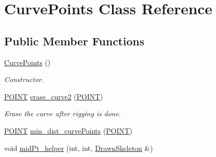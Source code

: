 \hypertarget{classCurvePoints}{\section{\-Curve\-Points \-Class \-Reference}
\label{classCurvePoints}
}
\subsection*{\-Public \-Member \-Functions}
\begin{DoxyCompactItemize}
\item 
\hypertarget{classCurvePoints_a7554f9637c23e73ea598f93992138d8e}{\hyperlink{classCurvePoints_a7554f9637c23e73ea598f93992138d8e}{\-Curve\-Points} ()}\label{classCurvePoints_a7554f9637c23e73ea598f93992138d8e}

\begin{DoxyCompactList}\small\item\em \-Constructor. \end{DoxyCompactList}\item 
\hyperlink{structPOINT}{\-P\-O\-I\-N\-T} \hyperlink{classCurvePoints_a8079243e2e447c8a8bbc007fb373e051}{erase\-\_\-curve2} (\hyperlink{structPOINT}{\-P\-O\-I\-N\-T})
\begin{DoxyCompactList}\small\item\em \-Erase the curve after rigging is done. \end{DoxyCompactList}\item 
\hyperlink{structPOINT}{\-P\-O\-I\-N\-T} \hyperlink{classCurvePoints_ada5417c6f98b520fc5e5ef091ee1b731}{min\-\_\-dist\-\_\-curve\-Points} (\hyperlink{structPOINT}{\-P\-O\-I\-N\-T})
\item 
\hypertarget{classCurvePoints_a0a727d9a92c3a95973841ae164f27bdc}{void \hyperlink{classCurvePoints_a0a727d9a92c3a95973841ae164f27bdc}{mid\-Pt\-\_\-helper} (int, int, \hyperlink{classDrawnSkeleton}{\-Drawn\-Skeleton} \&)}\label{classCurvePoints_a0a727d9a92c3a95973841ae164f27bdc}


\end{DoxyCompactItemize}
